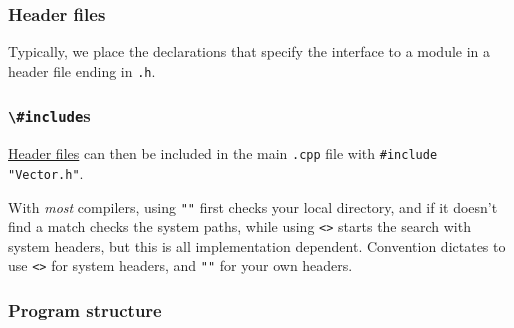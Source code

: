 \documentclass[8pt, table, xcdraw]{article}%
\begin{document}
\subsubsection{Header files} \label{headerfiles}
Typically, we place the declarations that specify the interface to a module in a header file ending in \lstinline{.h}.

\subsubsection{\lstinline{\#include}s}
\hyperref[headerfiles]{Header files} can then be included in the main \lstinline{.cpp} file with \lstinline{#include "Vector.h"}.

With \emph{most} compilers, using \lstinline{""} first checks your local directory, and if it doesn't find a match checks the system paths, while using \lstinline{<>} starts the search with system headers, but this is all implementation dependent. Convention dictates to use \lstinline{<>} for system headers, and \lstinline{""} for your own headers.

\subsubsection{Program structure}

\end{document}
